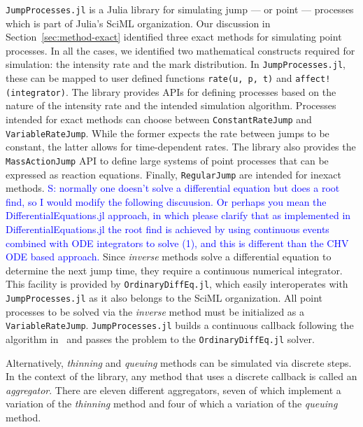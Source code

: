\documentclass{juliacon}
\newcommand{\comment}[1]{\textcolor{blue}{#1}}
\begin{document}
\texttt{JumpProcesses.jl} is a Julia library for simulating jump --- or point --- processes which is part of Julia's SciML organization.
Our discussion in Section~\ref{sec:method-exact} identified three exact methods for simulating point processes. In all the cases, we identified two mathematical constructs required for simulation: the intensity rate and the mark distribution. In \texttt{JumpProcesses.jl}, these can be mapped to user defined functions \texttt{rate(u, p, t)} and \texttt{affect!(integrator)}. The library provides APIs for defining processes based on the nature of the intensity rate and the intended simulation algorithm. Processes intended for exact methods can choose between \texttt{ConstantRateJump} and \texttt{VariableRateJump}. While the former expects the rate between jumps to be constant, the latter allows for time-dependent rates. The library also provides the \texttt{MassActionJump} API to define large systems of point processes that can be expressed as reaction equations. Finally, \texttt{RegularJump} are intended for inexact methods.
\comment{S: normally one doesn't solve a differential equation but does a root find, so I would modify the following discuusion. Or perhaps you mean the DifferentialEquations.jl approach, in which please clarify that as implemented in DifferentialEquations.jl the root find is achieved by using continuous events combined with ODE integrators to solve (1), and this is different than the CHV ODE based approach.}
Since \textit{inverse} methods solve a differential equation to determine the next jump time, they require a continuous numerical integrator. This facility is provided by \texttt{OrdinaryDiffEq.jl}, which easily interoperates with \texttt{JumpProcesses.jl} as it also belongs to the SciML organization. All point processes to be solved via the \textit{inverse} method must be initialized as a \texttt{VariableRateJump}. \texttt{JumpProcesses.jl} builds a continuous callback following the algorithm in~\cite{salis2005} and passes the problem to the \texttt{OrdinaryDiffEq.jl} solver.

Alternatively, \textit{thinning} and \textit{queuing} methods can be simulated via discrete steps. In the context of the library, any method that uses a discrete callback is called an \textit{aggregator}. There are eleven different aggregators, seven of which implement a variation of the \textit{thinning} method and four of which a variation of the \textit{queuing} method.
\end{document}

